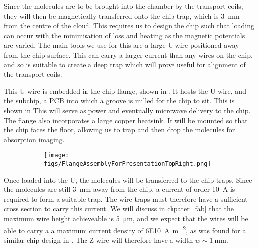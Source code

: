 Since the molecules are to be brought into the chamber by the transport coils,
they will then be magnetically transferred onto the chip trap, which is
\SI{3}{\milli\meter} from the centre of the cloud. This requires us
to design the chip such that loading can occur with the minimisation of loss
and heating as the magnetic potentials are varied. The main tools we use for
this are a large U wire positioned away from the chip surface. This can carry a
larger current than any wires on the chip, and so is suitable to create a deep
trap which will prove useful for alignment of the transport
coils.~\cite{Ott2001}

This U wire is embedded in the chip flange, shown in
. It hosts the U wire, and the subchip, a PCB
into which a groove is milled for the chip to sit. This is shown in
 This will serve as power and
eventually microwave delivery to the chip. The flange also incorporates a large
copper heatsink. It will be mounted so that the chip faces the floor, allowing
us to trap and then drop the molecules for absorption imaging.~\cite{}

\begin{figure}
  \centering
    \begin{subfigure}{.3\textwidth}
      \texttt{[image: figs/FlangeAssemblyForPresentationTopRight.png]}
      \caption{}
    \end{subfigure}
    \begin{subfigure}{.3\textwidth}
      \caption{}
    \end{subfigure}
    \begin{subfigure}{.3\textwidth}
      \caption{}
    \end{subfigure}
  \caption{}
  \label{design:fig:chipexperiment}
\end{figure}

Once loaded into the U, the molecules will be transferred to the chip traps.
Since the molecules are still \SI{3}{\milli\meter} away from the chip, a
current of order \SI{10}{\ampere} is required to form a suitable trap. The wire
traps must therefore have a sufficient cross section to carry this current.
We will discuss in chpater~\ref{fab} that the maximum wire height achieveable
is \SI{5}{\micro\meter}, and we expect that the wires will be able to carry a 
a maximum current density of \SI{6E10}{\ampere\per\meter\squared}, as was found
for a similar chip design in . The Z wire will
therefore have a width $w\sim\SI{1}{\milli\meter}$.

